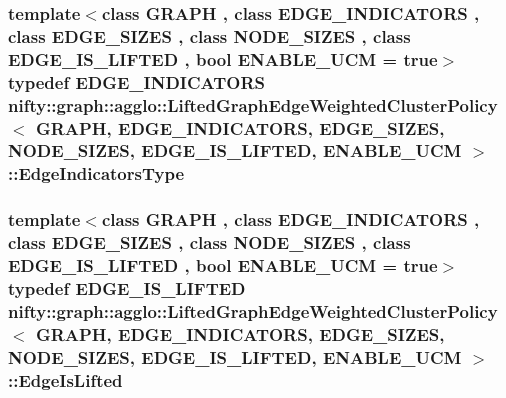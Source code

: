 \subsubsection[{Edge\+Indicators\+Type}]{\setlength{\rightskip}{0pt plus 5cm}template$<$class G\+R\+A\+P\+H , class E\+D\+G\+E\+\_\+\+I\+N\+D\+I\+C\+A\+T\+O\+R\+S , class E\+D\+G\+E\+\_\+\+S\+I\+Z\+E\+S , class N\+O\+D\+E\+\_\+\+S\+I\+Z\+E\+S , class E\+D\+G\+E\+\_\+\+I\+S\+\_\+\+L\+I\+F\+T\+E\+D , bool E\+N\+A\+B\+L\+E\+\_\+\+U\+C\+M = true$>$ typedef E\+D\+G\+E\+\_\+\+I\+N\+D\+I\+C\+A\+T\+O\+R\+S {\bf nifty\+::graph\+::agglo\+::\+Lifted\+Graph\+Edge\+Weighted\+Cluster\+Policy}$<$ G\+R\+A\+P\+H, E\+D\+G\+E\+\_\+\+I\+N\+D\+I\+C\+A\+T\+O\+R\+S, E\+D\+G\+E\+\_\+\+S\+I\+Z\+E\+S, N\+O\+D\+E\+\_\+\+S\+I\+Z\+E\+S, E\+D\+G\+E\+\_\+\+I\+S\+\_\+\+L\+I\+F\+T\+E\+D, E\+N\+A\+B\+L\+E\+\_\+\+U\+C\+M $>$\+::{\bf Edge\+Indicators\+Type}}\label{classnifty_1_1graph_1_1agglo_1_1LiftedGraphEdgeWeightedClusterPolicy_ad0813aa75f1e76d10b794cab88615f61}
\hypertarget{classnifty_1_1graph_1_1agglo_1_1LiftedGraphEdgeWeightedClusterPolicy_ad104d8984e0964ccfb7d1ec06ee977a2}{}
\subsubsection[{Edge\+Is\+Lifted}]{\setlength{\rightskip}{0pt plus 5cm}template$<$class G\+R\+A\+P\+H , class E\+D\+G\+E\+\_\+\+I\+N\+D\+I\+C\+A\+T\+O\+R\+S , class E\+D\+G\+E\+\_\+\+S\+I\+Z\+E\+S , class N\+O\+D\+E\+\_\+\+S\+I\+Z\+E\+S , class E\+D\+G\+E\+\_\+\+I\+S\+\_\+\+L\+I\+F\+T\+E\+D , bool E\+N\+A\+B\+L\+E\+\_\+\+U\+C\+M = true$>$ typedef E\+D\+G\+E\+\_\+\+I\+S\+\_\+\+L\+I\+F\+T\+E\+D {\bf nifty\+::graph\+::agglo\+::\+Lifted\+Graph\+Edge\+Weighted\+Cluster\+Policy}$<$ G\+R\+A\+P\+H, E\+D\+G\+E\+\_\+\+I\+N\+D\+I\+C\+A\+T\+O\+R\+S, E\+D\+G\+E\+\_\+\+S\+I\+Z\+E\+S, N\+O\+D\+E\+\_\+\+S\+I\+Z\+E\+S, E\+D\+G\+E\+\_\+\+I\+S\+\_\+\+L\+I\+F\+T\+E\+D, E\+N\+A\+B\+L\+E\+\_\+\+U\+C\+M $>$\+::{\bf Edge\+Is\+Lifted}}\label{classnifty_1_1graph_1_1agglo_1_1LiftedGraphEdgeWeightedClusterPolicy_ad104d8984e0964ccfb7d1ec06ee977a2}
\hypertarget{classnifty_1_1graph_1_1agglo_1_1LiftedGraphEdgeWeightedClusterPolicy_ad63cc4f759cd05f1bf9b7fec48629221}{}
